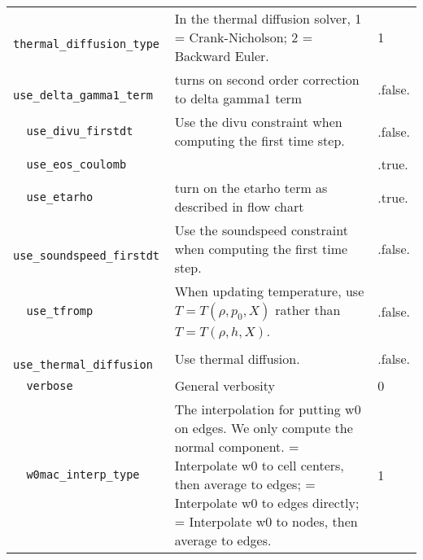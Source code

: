 {\begin{center}
\begin{longtable}{|l|p{3.25in}|l|}
\verb=  thermal_diffusion_type  = &   In the thermal diffusion solver, 1 = Crank-Nicholson; 2 = Backward Euler.  &  1 \\
\verb=  use_delta_gamma1_term  = &   turns on second order correction to delta gamma1 term  &  .false. \\
\verb=  use_divu_firstdt  = &   Use the divu constraint when computing the first time step.  &  .false. \\
\verb=  use_eos_coulomb  = &    &  .true. \\
\verb=  use_etarho  = &   turn on the etarho term as described in flow chart  &  .true. \\
\verb=  use_soundspeed_firstdt  = &   Use the soundspeed constraint when computing the first time step.  &  .false. \\
\verb=  use_tfromp  = &   When updating temperature, use $T=T(\rho,p_0,X) $ rather than $T=T(\rho,h,X)$.  &  .false. \\
\verb=  use_thermal_diffusion  = &   Use thermal diffusion.  &  .false. \\
\verb=  verbose  = &   General verbosity  &  0 \\
\verb=  w0mac_interp_type  = &   The interpolation for putting w0 on edges.  We only compute the normal component. \newline 1 = Interpolate w0 to cell centers, then average to edges; \newline 2 = Interpolate w0 to edges directly;                \newline 3 = Interpolate w0 to nodes, then average to edges.  &  1 \\


\end{longtable}
\end{center}

} %

%


